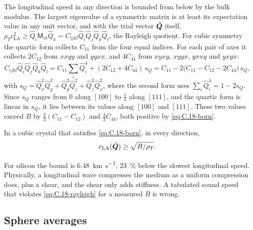 The longitudinal speed in any direction is bounded from below by the bulk modulus. The largest eigenvalue of a symmetric matrix is at least its expectation value in any unit vector, and with the trial vector $\hat{\bm{Q}}$ itself, $\rho_Tc_{\mathrm{LA}}^2 \ge \hat Q_i\mathsf{M}_{ik}\hat Q_k = C_{ijkl}\hat Q_i\hat Q_j\hat Q_k\hat Q_l$, the Rayleigh quotient. For cubic symmetry the quartic form collects $C_{11}$ from the four equal indices. For each pair of axes it collects $2C_{12}$ from $xxyy$ and $yyxx$, and $4C_{44}$ from $xyxy$, $xyyx$, $yxxy$ and $yxyx$:
\begin{equation*}
  C_{ijkl}\hat Q_i\hat Q_j\hat Q_k\hat Q_l = C_{11}\sum_i\hat Q_i^4 + (2C_{12} + 4C_{44})\,s_Q = C_{11} - 2\bigl(C_{11} - C_{12} - 2C_{44}\bigr)\,s_Q ,
\end{equation*}
with $s_Q = \hat Q_x^2\hat Q_y^2 + \hat Q_y^2\hat Q_z^2 + \hat Q_z^2\hat Q_x^2$, where the second form uses $\sum_i\hat Q_i^4 = 1 - 2s_Q$. Since $s_Q$ ranges from 0 along $[100]$ to $\tfrac13$ along $[111]$, and the quartic form is linear in $s_Q$, it lies between its values along $[100]$ and $[111]$. These two values exceed $B$ by $\tfrac23(C_{11} - C_{12})$ and $\tfrac43C_{44}$, both positive by \cref{eq:C.18-born}.
\begin{keyresult}
In a cubic crystal that satisfies \cref{eq:C.18-born}, in every direction,
\begin{equation}
  c_{\mathrm{LA}}(\hat{\bm{Q}}) \ge \sqrt{B/\rho_T} .
  \label{eq:C.18-rayleigh}
\end{equation}
\end{keyresult}
For silicon the bound is \SI{6.48}{km.s^{-1}}, \SI{23}{\percent} below the slowest longitudinal speed. Physically, a longitudinal wave compresses the medium as a uniform compression does, plus a shear, and the shear only adds stiffness. A tabulated sound speed that violates \cref{eq:C.18-rayleigh} for a measured $B$ is wrong.

\subsection{Sphere averages}

